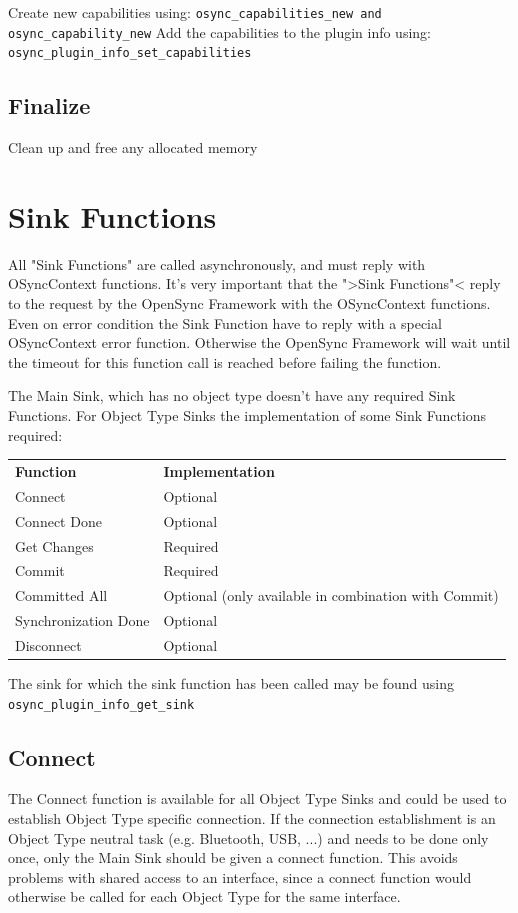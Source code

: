 Create new capabilities using:
\verb|osync_capabilities_new and osync_capability_new|
Add the capabilities to the plugin info using:
\verb|osync_plugin_info_set_capabilities|
\subsection{Finalize}
Clean up and free any allocated memory
\section{Sink Functions}
All "Sink Functions" are called asynchronously, and must reply with OSyncContext functions.
 It's very important that the ">Sink Functions"< reply to the
request by the OpenSync Framework with the OSyncContext functions. Even on
error condition the Sink Function have to reply with a special OSyncContext
error function. Otherwise the OpenSync Framework will wait until the timeout for this
function call is reached before failing the function.

The Main Sink, which has no object type doesn't have any required Sink 
Functions. For Object Type Sinks the implementation of some Sink 
Functions required:

\begin{center}
\begin{tabular}{ll}
\textbf{Function} & \textbf{Implementation} \\ 
Connect & Optional \\
Connect Done & Optional \\
Get Changes & Required \\ 
Commit & Required \\ 
Committed All & Optional (only available in combination with Commit)\\ 
Synchronization Done & Optional \\ 
Disconnect & Optional
\end{tabular}
\end{center}

The sink for which the sink function has been called may be found using
\verb|osync_plugin_info_get_sink|

\subsection{Connect}
The Connect function is available for all Object Type Sinks and could be used to
establish Object Type specific connection. If the connection establishment is an
Object Type neutral task (e.g. Bluetooth, USB, ...) and needs to be done only
once, only the Main Sink should be given a connect function. This avoids
problems with shared access to an interface, since a connect function would
otherwise be called for each Object Type for the same interface.

